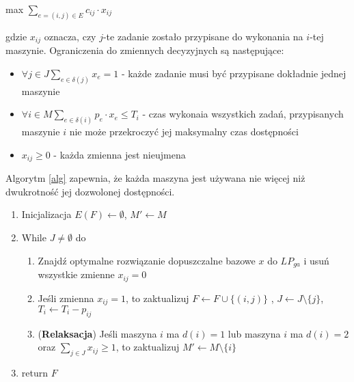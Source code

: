 \documentclass[12pt, a4paper]{article}
\begin{document}
\begin{center}
	max \textbf{$\displaystyle\sum_{e=(i,j) \in E} c_{ij} \cdot x_{ij}$}
\end{center}
gdzie $x_{ij}$ oznacza, czy $j$-te zadanie zostało przypisane do wykonania
na $i$-tej maszynie.
Ograniczenia do zmiennych decyzyjnych są następujące:

\begin{itemize}
  \item $\forall{j \in J} \displaystyle\sum_{e \in \delta(j)} x_e = 1$ - każde zadanie musi być przypisane dokładnie jednej maszynie
  \item $\forall{i \in M} \displaystyle\sum_{e \in \delta(i)} p_e \cdot x_e \leq T_i$ - czas wykonaia wszystkich zadań, przypisanych maszynie $i$ nie może
przekroczyć jej maksymalny czas dostępności
  \item $x_{ij} \geq 0$ - każda zmienna jest nieujmena
\end{itemize}

Algorytm \ref{alg} zapewnia, że każda maszyna jest używana
nie więcej niż dwukrotność jej dozwolonej dostępności.

\begin{algorithm}
\caption{}\label{alg}
\begin{enumerate}
  \item Inicjalizacja $E(F) \gets \emptyset$, $M' \gets M$ 
  \item While $J \neq \emptyset$ do
  \begin{enumerate}
    \item Znajdź optymalne rozwiązanie dopuszczalne bazowe $x$ do $LP_{ga}$
    i usuń wszystkie zmienne $x_{ij} = 0$
    \item Jeśli zmienna $x_{ij} = 1$, to zaktualizuj $F \gets F \cup \{(i, j)\}$
    , $J \gets J \setminus \{j\}$, $T_i \gets T_i - p_{ij}$
    \item (\textbf{Relaksacja}) Jeśli maszyna $i$ ma $d(i) = 1$ lub maszyna
    $i$ ma $d(i) = 2$ oraz $\displaystyle\sum_{j \in J} x_{ij} \geq 1$, to zaktualizuj $M' \gets M \setminus \{i\}$
  \end{enumerate}
  \item return $F$
\end{enumerate}
\end{algorithm}
\end{document}
